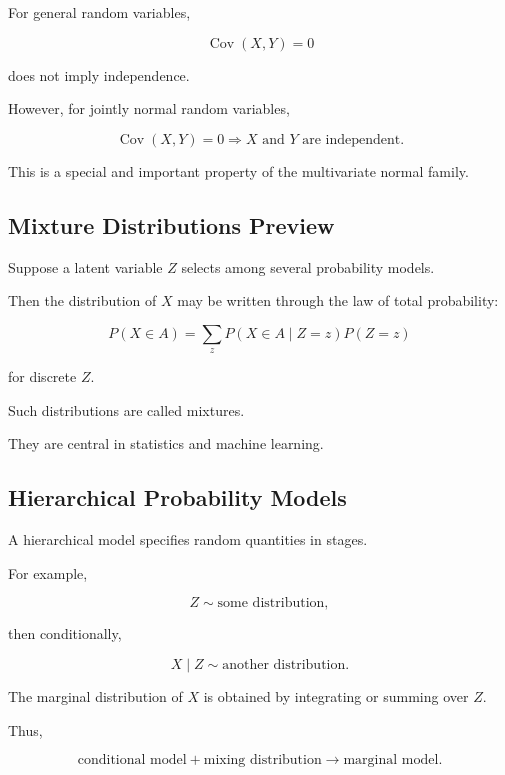 For general random variables,

\[
\operatorname{Cov}(X,Y)=0
\]

does not imply independence.

However, for jointly normal random variables,

\[
\boxed{
\operatorname{Cov}(X,Y)=0
\Longrightarrow
X\text{ and }Y\text{ are independent}.
}
\]

This is a special and important property of the multivariate normal
family.

\subsection{Mixture Distributions Preview}
\label{subsec:mixture-distributions-preview}

Suppose a latent variable \(Z\) selects among several probability
models.

Then the distribution of \(X\) may be written through the law of total
probability:

\[
\boxed{
P(X\in A)
=
\sum_z
P(X\in A\mid Z=z)P(Z=z)
}
\]

for discrete \(Z\).

Such distributions are called mixtures.

They are central in statistics and machine learning.

\subsection{Hierarchical Probability Models}
\label{subsec:hierarchical-probability-models}

A hierarchical model specifies random quantities in stages.

For example,

\[
Z
\sim
\text{some distribution},
\]

then conditionally,

\[
X\mid Z
\sim
\text{another distribution}.
\]

The marginal distribution of \(X\) is obtained by integrating or summing
over \(Z\).

Thus,

\[
\boxed{
\text{conditional model}
+
\text{mixing distribution}
\longrightarrow
\text{marginal model}.
}
\]

